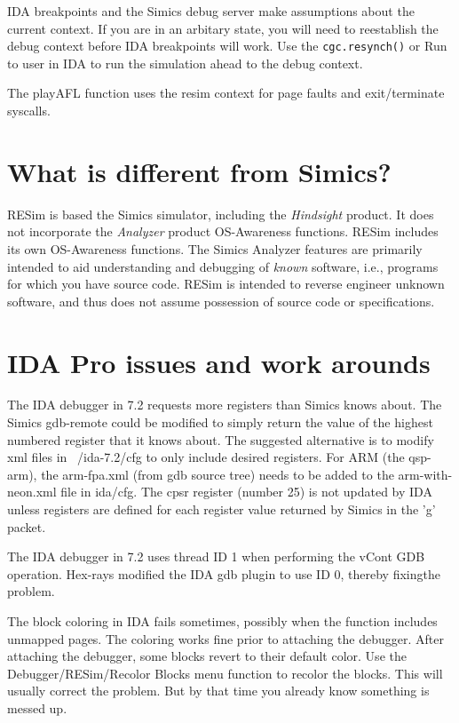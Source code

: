 \documentclass[titlepage]{article}
\begin{document}
\begin{appendices}
IDA breakpoints and the Simics debug server make assumptions about the current context.  If you are in an arbitary state, 
you will need to reestablish the debug context before IDA breakpoints will work.
Use the {\tt cgc.resynch()} or Run to user in IDA to run the simulation ahead to the debug context.

The playAFL function uses the resim context for page faults and exit/terminate syscalls.


\section{What is different from Simics?}
RESim is based the Simics simulator, including the \textit{Hindsight} product.  It does not incorporate the \textit{Analyzer} product
OS-Awareness functions.  RESim includes its own OS-Awareness functions.  The Simics Analyzer features are primarily intended to aid
understanding and debugging of \textit{known} software, i.e., programs for which you have source code.  RESim is intended to reverse
engineer unknown software, and thus does not assume possession of source code or specifications.

\section{IDA Pro issues and work arounds}
The IDA debugger in 7.2 requests more registers than Simics knows about.  The Simics gdb-remote could be modified
to simply return the value of the highest numbered register that it knows about.  The suggested alternative is to modify
xml files in ~/ida-7.2/cfg to only include desired registers.   For ARM (the qsp-arm), the arm-fpa.xml (from gdb source
tree) needs to be added to the arm-with-neon.xml file in ida/cfg.  The cpsr register (number 25) is not updated by IDA
unless registers are defined for each register value returned by Simics in the 'g' packet.

The IDA debugger in 7.2 uses thread ID 1 when performing the vCont GDB operation.  Hex-rays modified the IDA gdb plugin to
use ID 0, thereby fixingthe problem.

The block coloring in IDA fails sometimes, possibly when the function includes unmapped pages.  The coloring works fine prior
to attaching the debugger.  After attaching the debugger, some blocks revert to their default color.  Use the Debugger/RESim/Recolor Blocks
menu function to recolor the blocks. 
This will usually correct the problem.  But by that time you already know something is messed up.


\end{appendices}
\end{document}
